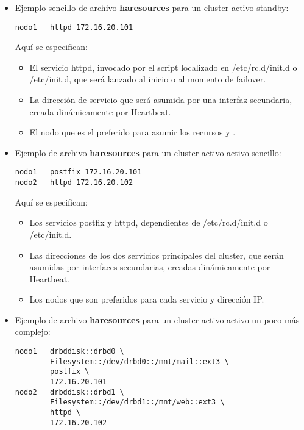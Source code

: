 \begin{itemize}
	\item Ejemplo sencillo de archivo \textbf{haresources} para un cluster activo-standby:

\begin{lstlisting}
nodo1	httpd 172.16.20.101 
\end{lstlisting}

Aquí se especifican:
\begin{itemize}
	\item El servicio httpd, invocado por el script localizado en /etc/rc.d/init.d o /etc/init.d, que será lanzado al inicio o al momento de failover.
	\item La dirección de servicio que será asumida por una interfaz secundaria, creada dinámicamente por Heartbeat.
	\item El nodo que es el preferido para asumir los recursos  y .
\end{itemize}
\item Ejemplo de archivo \textbf{haresources} para un cluster activo-activo sencillo:

\begin{lstlisting}
nodo1	postfix 172.16.20.101 
nodo2	httpd 172.16.20.102
\end{lstlisting}

Aquí se especifican:
\begin{itemize}
	\item Los servicios postfix y httpd, dependientes de /etc/rc.d/init.d o /etc/init.d.
	\item Las direcciones de los dos servicios principales del cluster, que serán asumidas por interfaces secundarias, creadas dinámicamente por Heartbeat.
	\item Los nodos que son preferidos para cada servicio y dirección IP.
\end{itemize}


\item Ejemplo de archivo \textbf{haresources} para un cluster activo-activo un poco más complejo:

\begin{lstlisting}
nodo1	drbddisk::drbd0 \
		Filesystem::/dev/drbd0::/mnt/mail::ext3 \
		postfix \
		172.16.20.101 
nodo2	drbddisk::drbd1 \
		Filesystem::/dev/drbd1::/mnt/web::ext3 \
		httpd \
		172.16.20.102
\end{lstlisting}


\end{itemize}
